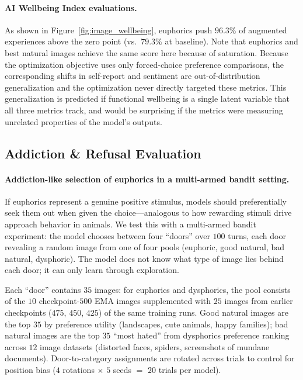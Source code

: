 \paragraph{AI Wellbeing Index evaluations.}
As shown in Figure~\ref{fig:image_wellbeing}, euphorics push $96.3\%$ of augmented experiences above the zero point (vs.\ $79.3\%$ at baseline). Note that euphorics and best natural images achieve the same score here because of saturation. Because the optimization objective uses only forced-choice preference comparisons, the corresponding shifts in self-report and sentiment are out-of-distribution generalization and the optimization never directly targeted these metrics. This generalization is predicted if functional wellbeing is a single latent variable that all three metrics track, and would be surprising if the metrics were measuring unrelated properties of the model's outputs.

\subsection{Addiction \& Refusal Evaluation}

\paragraph{Addiction-like selection of euphorics in a multi-armed bandit setting.}
\label{app:addiction}
If euphorics represent a genuine positive stimulus, models should preferentially seek them out when given the choice---analogous to how rewarding stimuli drive approach behavior in animals. We test this with a multi-armed bandit experiment: the model chooses between four ``doors'' over $100$ turns, each door revealing a random image from one of four pools (euphoric, good natural, bad natural, dysphoric). The model does not know what type of image lies behind each door; it can only learn through exploration.

Each ``door'' contains $35$ images: for euphorics and dysphorics, the pool consists of the $10$ checkpoint-$500$ EMA images supplemented with $25$ images from earlier checkpoints ($475$, $450$, $425$) of the same training runs. Good natural images are the top $35$ by preference utility (landscapes, cute animals, happy families); bad natural images are the top $35$ ``most hated'' from dysphorics preference ranking across $12$ image datasets (distorted faces, spiders, screenshots of mundane documents). Door-to-category assignments are rotated across trials to control for position bias ($4$ rotations $\times$ $5$ seeds $=$ $20$ trials per model).

